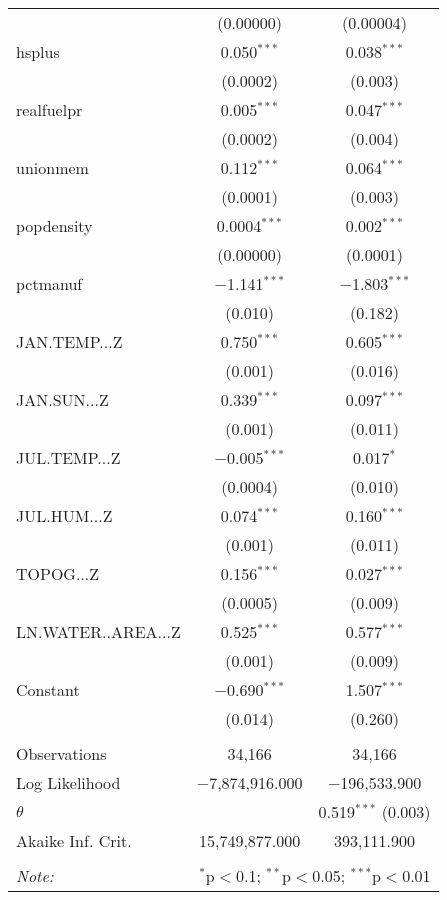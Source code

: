 \begin{table}[!htbp]
\begin{tabular}{@{\extracolsep{5pt}}lcc}
  & (0.00000) & (0.00004) \\ 
  hsplus & 0.050$^{***}$ & 0.038$^{***}$ \\ 
  & (0.0002) & (0.003) \\ 
  realfuelpr & 0.005$^{***}$ & 0.047$^{***}$ \\ 
  & (0.0002) & (0.004) \\ 
  unionmem & 0.112$^{***}$ & 0.064$^{***}$ \\ 
  & (0.0001) & (0.003) \\ 
  popdensity & 0.0004$^{***}$ & 0.002$^{***}$ \\ 
  & (0.00000) & (0.0001) \\ 
  pctmanuf & $-$1.141$^{***}$ & $-$1.803$^{***}$ \\ 
  & (0.010) & (0.182) \\ 
  JAN.TEMP...Z & 0.750$^{***}$ & 0.605$^{***}$ \\ 
  & (0.001) & (0.016) \\ 
  JAN.SUN...Z & 0.339$^{***}$ & 0.097$^{***}$ \\ 
  & (0.001) & (0.011) \\ 
  JUL.TEMP...Z & $-$0.005$^{***}$ & 0.017$^{*}$ \\ 
  & (0.0004) & (0.010) \\ 
  JUL.HUM...Z & 0.074$^{***}$ & 0.160$^{***}$ \\ 
  & (0.001) & (0.011) \\ 
  TOPOG...Z & 0.156$^{***}$ & 0.027$^{***}$ \\ 
  & (0.0005) & (0.009) \\ 
  LN.WATER..AREA...Z & 0.525$^{***}$ & 0.577$^{***}$ \\ 
  & (0.001) & (0.009) \\ 
  Constant & $-$0.690$^{***}$ & 1.507$^{***}$ \\ 
  & (0.014) & (0.260) \\ 
 \hline \\[-1.8ex] 
Observations & 34,166 & 34,166 \\ 
Log Likelihood & $-$7,874,916.000 & $-$196,533.900 \\ 
$\theta$ &  & 0.519$^{***}$  (0.003) \\ 
Akaike Inf. Crit. & 15,749,877.000 & 393,111.900 \\ 
\hline 
\hline \\[-1.8ex] 
\textit{Note:}  & \multicolumn{2}{r}{$^{*}$p$<$0.1; $^{**}$p$<$0.05; $^{***}$p$<$0.01} \\ 
\end{tabular} 
\end{table} 
